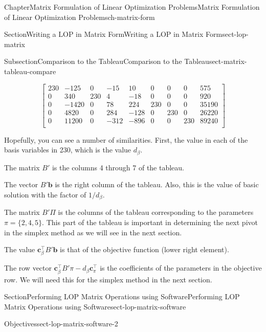 \documentclass[oneside,10pt,]{book}
\numberwithin{equation}{section}
\newcommand{\amp}{&}
\begin{document}
\begin{chapterptx}{Chapter}{Matrix Formulation of Linear Optimization Problems}{}{Matrix Formulation of Linear Optimization Problems}{}{}{ch-matrix-form}
\begin{sectionptx}{Section}{Writing a LOP in Matrix Form}{}{Writing a LOP in Matrix Form}{}{}{sect-lop-matrix}
\begin{subsectionptx}{Subsection}{Comparison to the Tableau}{}{Comparison to the Tableau}{}{}{sect-matrix-tableau-compare}
\par
%
\begin{equation*}
\left[\begin{array}{rrr|rrrrr|r}
230 \amp -125 \amp 0 \amp -15 \amp 10 \amp 0 \amp 0 \amp 0 \amp 575\\
0 \amp 340 \amp 230 \amp 4 \amp -18 \amp 0 \amp 0 \amp 0 \amp 920\\
0 \amp -1420 \amp 0 \amp 78 \amp 224 \amp 230 \amp 0 \amp 0 \amp 35190\\
0 \amp 4820 \amp 0 \amp 284 \amp -128 \amp 0 \amp 230 \amp 0 \amp 26220\\ \hline
0 \amp 11200 \amp 0 \amp -312 \amp -896 \amp 0 \amp 0 \amp 230 \amp 89240\\
\end{array} \right]
\end{equation*}
%
\par
Hopefully, you can see a number of similarities.  First, the value in each of the basis variables in 230, which is the value \(d_{\beta}\).%
\par
The matrix \(B'\) is the columns 4 through 7 of the tableau.%
\par
The vector \(B'\boldsymbol{b}\) is the right column of the tableau.  Also, this is the value of basic solution with the factor of \(1/d_{\beta}\).%
\par
The matrix \(B'\Pi\) is the columns of the tableau corresponding to the parameters \(\pi=\{2,4,5\}.\) This part of the tableau is important in determining the next pivot in the simplex method as we will see in the next section.%
\par
The value \(\boldsymbol{c}^{\intercal}_{\beta} B' \boldsymbol{b}\) is that of the objective function (lower right element).%
\par
The row vector \(\boldsymbol{c}^{\intercal}_{\beta} B'\pi - d_{\beta} \boldsymbol{c}^{\intercal}_{\pi}\) is the coefficients of the parameters in the objective row.  We will need this for the simplex method in the next section.%
\end{subsectionptx}
\end{sectionptx}
%
%
\typeout{************************************************}
\typeout{************************************************}
%
\begin{sectionptx}{Section}{Performing LOP Matrix Operations using Software}{}{Performing LOP Matrix Operations using Software}{}{}{sect-lop-matrix-software}
\begin{objectives}{Objectives}{sect-lop-matrix-software-2}

\end{objectives}
\end{sectionptx}
\end{chapterptx}
\end{document}
